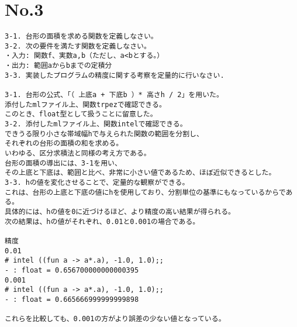 \documentclass{jarticle}
\begin{document}
\section{No.3}
\begin{verbatim}
3-1. 台形の面積を求める関数を定義しなさい。
3-2. 次の要件を満たす関数を定義しなさい。
・入力: 関数f、実数a,b（ただし、a<bとする。）
・出力: 範囲aからbまでの定積分
3-3. 実装したプログラムの精度に関する考察を定量的に行いなさい.

3-1. 台形の公式、「（ 上底a + 下底b ）* 高さh / 2」を用いた。
添付したmlファイル上、関数trpezで確認できる。
このとき、float型として扱うことに留意した。
3-2. 添付したmlファイル上、関数intelで確認できる。
できうる限り小さな帯域幅hで与えられた関数の範囲を分割し、
それぞれの台形の面積の和を求める。
いわゆる、区分求積法と同様の考え方である。
台形の面積の導出には、3-1を用い、
その上底と下底は、範囲と比べ、非常に小さい値であるため、ほぼ近似できるとした。
3-3. hの値を変化させることで、定量的な観察ができる。
これは、台形の上底と下底の値にhを使用しており、分割単位の基準にもなっているからである。
具体的には、hの値を0に近づけるほど、より精度の高い結果が得られる。
次の結果は、hの値がそれぞれ、0.01と0.001の場合である。

精度
0.01
# intel ((fun a -> a*.a), -1.0, 1.0);;
- : float = 0.656700000000000395
0.001
# intel ((fun a -> a*.a), -1.0, 1.0);;
- : float = 0.665666999999999898

これらを比較しても、0.001の方がより誤差の少ない値となっている。
\end{verbatim}

\newpage
\end{document}
